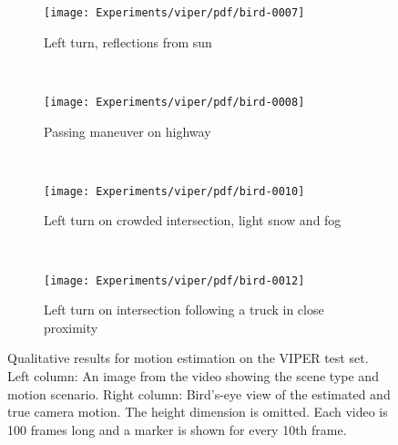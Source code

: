 		
		\begin{figure}[h]
			\centering
			\begin{subfigure}[t]{\linewidth}
				\centering
				\texttt{[image: Experiments/viper/pdf/bird-0007]}
				\caption{
					Left turn, reflections from sun
					\label{fig:viper-qualitative-sun-reflections}
				}
			\end{subfigure}%
			\\
			\begin{subfigure}[b]{\linewidth}
				\centering
				\texttt{[image: Experiments/viper/pdf/bird-0008]}
				\caption{
					Passing maneuver on highway
					\label{fig:viper-qualitative-passing-maneuver}
				}
			\end{subfigure}%
			\\
			\begin{subfigure}[b]{\linewidth}
				\centering
				\texttt{[image: Experiments/viper/pdf/bird-0010]}
				\caption{
					Left turn on crowded intersection, light snow and fog
					\label{fig:viper-qualitative-snow-crowded-intersection}
				}
			\end{subfigure}%
			\\
			\begin{subfigure}[b]{\linewidth}
				\centering
								\texttt{[image: Experiments/viper/pdf/bird-0012]}
				\caption{
					Left turn on intersection following a truck in close proximity
					\label{fig:viper-qualitative-truck-left-turn-close}
				}
			\end{subfigure}%
			\caption[Qualitative results for motion estimation on VIPER]
					{Qualitative results for motion estimation on the VIPER test set.
					 Left column: An image from the video showing the scene type and motion scenario.
					 Right column: Bird's-eye view of the estimated and true camera motion.
					 The height dimension is omitted.
					 Each video is 100 frames long and a marker is shown for every 10th frame.
					 \label{fig:viper-qualitative-results-images-and-estimation}}
		\end{figure}
		
